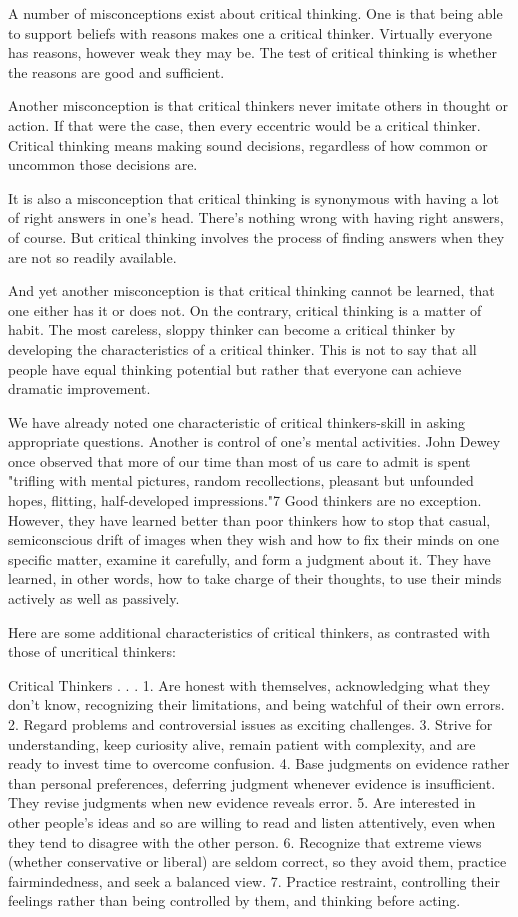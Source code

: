 \documentclass{book}
\begin{document}
A number of misconceptions exist about critical thinking. One is that being able to support beliefs with reasons makes one a critical thinker. Virtually everyone has reasons, however weak they may be. The test of critical thinking is whether the reasons are good and sufficient.

Another misconception is that critical thinkers never imitate others in thought or action. If that were the case, then every eccentric would be a critical thinker. Critical thinking means making sound decisions, regardless of how common or uncommon those decisions are.

It is also a misconception that critical thinking is synonymous with having a lot of right answers in one’s head. There’s nothing wrong with having right answers, of course. But critical thinking involves the process of finding answers when they are not so readily available.

And yet another misconception is that critical thinking cannot be learned, that one either has it or does not. On the contrary, critical thinking is a matter of habit. The most careless, sloppy thinker can become a critical thinker by developing the characteristics of a critical thinker. This is not to say that all people have equal thinking potential but rather that everyone can achieve dramatic improvement.

We have already noted one characteristic of critical thinkers-skill in asking appropriate questions. Another is control of one’s mental activities. John Dewey once observed that more of our time than most of us care to admit is spent "trifling with mental pictures, random recollections, pleasant but unfounded hopes, flitting, half-developed impressions."7 Good thinkers are no exception. However, they have learned better than poor thinkers how to stop that casual, semiconscious drift of images when they wish and how to fix their minds on one specific matter, examine it carefully, and form a judgment about it. They have learned, in other words, how to take charge of their thoughts, to use their minds actively as well as passively.

Here are some additional characteristics of critical thinkers, as contrasted with those of uncritical thinkers:

Critical Thinkers . . .
1. Are honest with themselves, acknowledging what they don’t know, recognizing their limitations, and being watchful of their own errors.
2. Regard problems and controversial issues as exciting challenges.
3. Strive for understanding, keep curiosity alive, remain patient with complexity, and are ready to invest time to overcome confusion.
4. Base judgments on evidence rather than personal preferences, deferring judgment whenever evidence is insufficient. They revise judgments when new evidence reveals error.
5. Are interested in other people’s ideas and so are willing to read and listen attentively, even when they tend to disagree with the other person.
6. Recognize that extreme views (whether conservative or liberal) are seldom correct, so they avoid them, practice fairmindedness, and seek a balanced view.
7. Practice restraint, controlling their feelings rather than being controlled by them, and thinking before acting.
\end{document}
